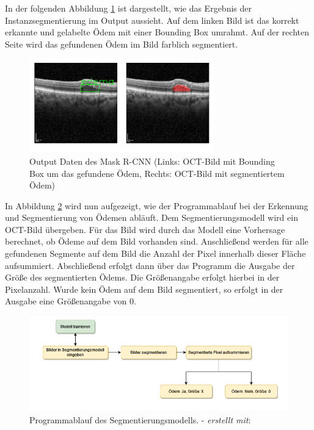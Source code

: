 In der folgenden Abbildung \ref{output_mrcnn} ist dargestellt, wie das Ergebnis der Instanzsegmentierung im Output aussieht. 
Auf dem linken Bild ist das korrekt erkannte und gelabelte Ödem mit einer Bounding Box umrahmt. 
Auf der rechten Seite wird das gefundenen Ödem im Bild farblich segmentiert. 

\begin{figure}[H]
\centering
\includegraphics[width=80mm,scale=1.5]{pic/Segmentierung/output_mrcnn.png}
\caption{\label{output_mrcnn}Output Daten des Mask R-CNN (Links: OCT-Bild mit Bounding Box um das gefundene Ödem, Rechts: OCT-Bild mit segmentiertem Ödem)}
\end{figure}



In Abbildung \ref{graph:programmablauf_seg} wird nun aufgezeigt, wie der Programmablauf bei der Erkennung und Segmentierung von Ödemen abläuft.
Dem Segmentierungsmodell wird ein OCT-Bild übergeben. Für das Bild wird durch das Modell eine Vorhersage berechnet, ob Ödeme auf dem Bild vorhanden sind. 
Anschließend werden für alle gefundenen Segmente auf dem Bild die Anzahl der Pixel innerhalb dieser Fläche aufsummiert. 
Abschließend erfolgt dann über das Programm die Ausgabe der Größe des segmentierten Ödems. Die Größenangabe erfolgt hierbei in der Pixelanzahl. 
Wurde kein Ödem auf dem Bild segmentiert, so erfolgt in der Ausgabe eine Größenangabe von 0. 

\begin{figure}[H]
\centering
\includegraphics[width=120mm,scale=1.5]{pic/Segmentierung/programmablauf_segmentation.png}
\caption{\label{graph:programmablauf_seg}Programmablauf des Segmentierungsmodells. - \textit{erstellt mit}: \cite{23}}
\end{figure}

